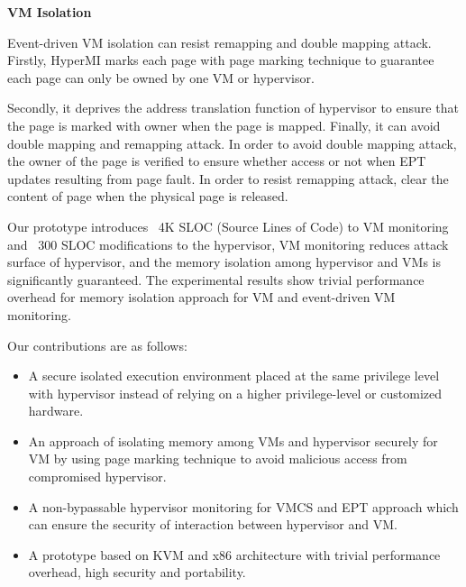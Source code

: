 \documentclass[conference]{IEEEtran}
\begin{document}
\textbf{VM Isolation}

Event-driven VM isolation can resist remapping and double mapping attack.
Firstly, HyperMI marks each page with page marking technique to guarantee each page can only be owned by one VM or hypervisor.

Secondly, it deprives the address translation function of hypervisor to ensure that the page is marked with owner when the page is mapped. 
Finally, it can avoid double mapping and remapping attack. In order to avoid double mapping attack, the owner of the page is verified to ensure whether access or not when EPT updates resulting from page fault. In order to resist remapping attack, clear the content of page when the physical page is released.



Our prototype introduces ~4K SLOC (Source Lines of Code) to VM monitoring and ~300 SLOC modifications to the hypervisor, VM monitoring reduces attack surface of hypervisor, and the memory isolation among hypervisor and VMs is significantly guaranteed. The experimental results show trivial performance overhead for memory isolation approach for VM and event-driven VM monitoring.


Our contributions are as follows:
\begin{itemize}
\item A secure isolated execution environment placed at the same privilege level with hypervisor instead of relying on a higher privilege-level or customized hardware.
\item{An approach of isolating memory among VMs and hypervisor securely for VM by using page marking technique to avoid malicious access from compromised hypervisor.}

\item{A non-bypassable hypervisor monitoring for VMCS and EPT approach  which can ensure the security of interaction between hypervisor and VM.}

\item{A prototype based on KVM and x86 architecture with trivial performance overhead, high security and portability.}

\end{itemize}
\end{document}
